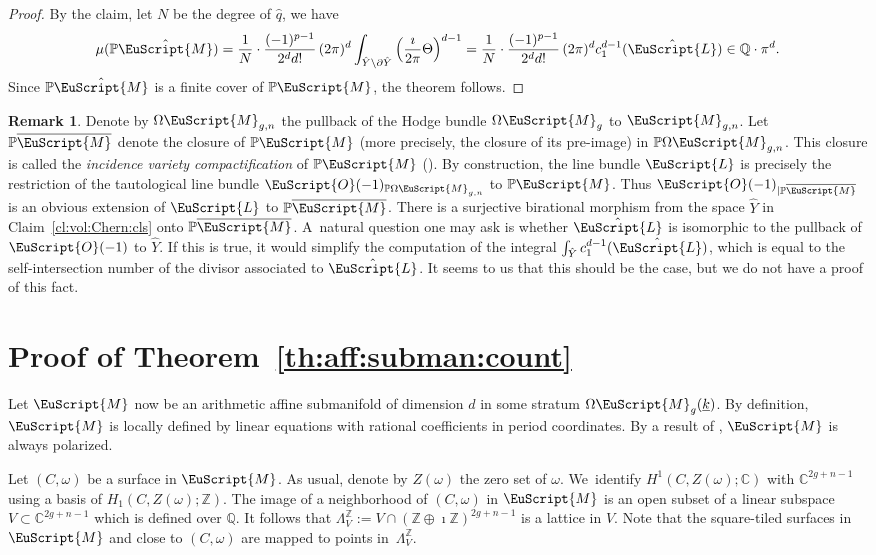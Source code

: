 \documentclass[10pt]{amsart}
\let\mathcal\EuScript
\theoremstyle{plain}
\theoremstyle{definition}
\newtheorem{Remark}[Theorem]{Remark}
\def\C{\mathbb{C}}
\newcommand\Z{\mathbb{Z}}
\newcommand{\Q}{\mathbb{Q}}
\newcommand{\Pb}{\mathbb{P}}
\newcommand{\Lcal}{\mathcal{L}}
\newcommand{\Mcal}{\mathcal{M}}
\newcommand{\Ocal}{\mathcal{O}}
\newcommand{\cL}{\mathcal{L}}
\newcommand{\cM}{\mathcal{M}}
\let\omg\omega
\let\ol\overline
\let\ul\underline
\newcommand{\trate}{\Omega\Mcal_{g}(\ul{k})}
\begin{document}
\begin{proof}
By the claim, let $N$ be the degree of $\hat{q}$, we have
\[
\mu(\Pb\hat{\cM})=\frac{1}{N}\cdot\frac{(-1)^{p-1}}{2^d d!}\,(2\pi)^d\int_{\hat{Y}\setminus\partial\hat{Y}}\left(\frac{\imath}{2\pi}\Theta\right)^{d-1} = \frac{1}{N}\cdot\frac{(-1)^{p-1}}{2^d d!}\,(2\pi)^d c_1^{d-1}(\hat{\cL})\in \Q\cdot\pi^d.
\]
Since $\Pb\hat{\cM}$ is a finite cover of $\Pb\cM$, the theorem follows.
\end{proof}

\begin{Remark}\label{rk:compare:ext:line:bdl}
Denote by $\Omega\Mcal_{g,n}$ the pullback of the Hodge bundle $\Omega\Mcal_g$ to $\Mcal_{g,n}$.
Let $\Pb\ol{\cM}$ denote the closure of $\Pb\Mcal$ (more precisely, the closure of its pre-image) in $\Pb\Omega\Mcal_{g,n}$.
This closure is called the \emph{incidence variety compactification} of $\Pb\cM$ (\cf \cite{BCGGM:abel}).
By construction, the line bundle $\Lcal$ is precisely the restriction of the tautological line bundle $\Ocal(-1)_{\Pb\Omega\Mcal_{g,n}}$ to $\Pb\cM$.
Thus $\Ocal(-1)_{|\Pb\ol{\Mcal}}$ is an obvious extension of $\Lcal$ to $\Pb\ol{\Mcal}$.
There is a surjective birational morphism from the space $\hat{Y}$ in Claim~\ref{cl:vol:Chern:cls} onto $\Pb\ol{\Mcal}$.
A~natural question one may ask is whether $\hat{\Lcal}$ is isomorphic to the pullback of $\Ocal(-1)$ to $\hat{Y}$.
If this is true, it would simplify the computation of the integral $\int_{\hat{Y}}c_1^{d-1}(\hat{\Lcal})$, which is equal to the self-intersection number of the divisor associated to $\hat{\Lcal}$.
It seems to us that this should be the case, but we do not have a proof of this fact.
\end{Remark}

\section{Proof of Theorem~\ref{th:aff:subman:count}}\label{sec:proof:theorem2}
Let $\Mcal$ now be an arithmetic affine submanifold of dimension $d$ in some stratum $\trate$.
By definition, $\Mcal$ is locally defined by linear equations with rational coefficients in period coordinates.
By a result of \cite{AEM17}, $\Mcal$ is always polarized.

Let $(C,\omega)$ be a surface in $\Mcal$. As usual, denote by $Z(\omega)$ the zero set of $\omega$.
We~identify $H^1(C,Z(\omg);\C)$ with $\C^{2g+n-1}$ using a basis of $H_1(C,Z(\omg);\Z)$.
The image of a neighborhood of $(C,\omega)$ in $\Mcal$ is an open subset of a linear subspace $V\subset \C^{2g+n-1}$ which is defined over $\Q$.
It follows that $\Lambda^\Z_V:=V\cap (\Z\oplus\imath\Z)^{2g+n-1}$ is a lattice in $V$.
Note that the square-tiled surfaces in $\cM$ and close to $(C,\omg)$ are mapped to points in~$\Lambda^\Z_V$.
\end{document}
